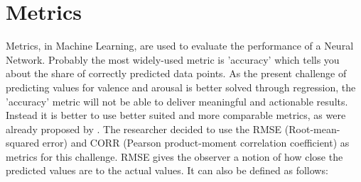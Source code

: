 

\section{Metrics}
Metrics, in Machine Learning, are used to evaluate the performance of a Neural Network. Probably the most widely-used metric is 'accuracy' which tells you about the share of correctly predicted data points. 
\newline\newline
As the present challenge of predicting values for valence and arousal is better solved through regression, the 'accuracy' metric will not be able to deliver meaningful and actionable results. Instead it is better to use better suited and more comparable metrics, as were already proposed by \citet{Kossaifi:2017:AFEW-VADatabase}. The researcher decided to use the RMSE (Root-mean-squared error) and CORR (Pearson product-moment correlation coefficient) as metrics for this challenge.
\newline\newline
RMSE gives the observer a notion of how close the predicted values are to the actual values. It can also be defined as follows:

